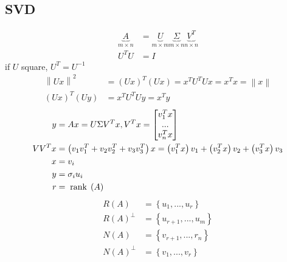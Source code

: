 \documentclass{article}
\begin{document}
\subsection{SVD}
\begin{align*}
\underbrace{A}_{m \times n} &= \underbrace{U}_{m \times m} \underbrace{\Sigma}_{m \times n} \underbrace{V^{T}}_{n \times n}
\\ U^{T}  U &= I 
\end{align*}
if $U $ square, $U^{T} = U^{-1}$
\begin{align*}
\left\| U x \right\|^{2} &= \left(U x\right)^{T} \left(U x\right) = x^{T} U^{T} U x = x^{T} x = \left\|x \right\|
\\ \left(U  x\right)^{T} \left(U y\right) &= x^{T} U^{T} U y = x^{T} y 
\end{align*}
\begin{align*}
y  &= A x = U \Sigma V^{T} x, V^{T} x = \begin{bmatrix} v_{1}^{T} x \\ ... \\ v_{n}^{T} x \end{bmatrix}
\\ V  V^{T} x &= \left(v_{1} v_{1}^{T} + v_{2} v_{2}^{T} + v_{3} v_{3}^{T}\right) x = \left(v_{1}^{T} x\right) v_{1} + \left(v_{2}^{T} x\right) v_{2} + \left(v_{3}^{T} x\right) v_{3}
\\ x  &= v_{i}
\\ y  &= \sigma_{i} u_{i}
\\ r  &= \text{\;rank\;}\left(A\right)
\end{align*}
\begin{align*}
R\left(A\right)  &= \left\{u_{1}, ..., u_{r}\right\}
\\ R\left(A\right) ^{\bot} &= \left\{u_{r+1}, ..., u_{m}\right\}
\\ N\left(A\right)  &= \left\{v_{r+1}, ..., r_{n}\right\}
\\ N\left(A\right) ^{\bot} &= \left\{v_{1}, ..., v_{r}\right\}
\end{align*}
\end{document}
